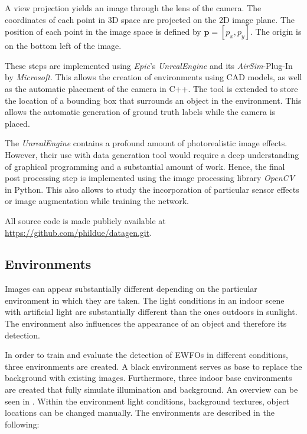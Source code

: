 A view projection yields an image through the lens of the camera. The coordinates of each point in 3D space are projected on the 2D image plane. The position of each point in the image space is defined by $\textbf{p} = [p_x,p_y]$. The origin is on the bottom left of the image.

These steps are implemented using \textit{Epic}'s \textit{UnrealEngine}\cite{unreal} and its \textit{AirSim}-Plug-In\cite{airsim} by \textit{Microsoft}. This allows the creation of environments using \ac{CAD} models, as well as the automatic placement of the camera in C++. The tool is extended to store the location of a bounding box that surrounds an object in the environment. This allows the automatic generation of ground truth labels while the camera is placed.

The \textit{UnrealEngine} contains a profound amount of photorealistic image effects. However, their use with data generation tool would require a deep understanding of graphical programming and a substantial amount of work. Hence, the final post processing step is implemented using the image processing library \textit{OpenCV} in Python. This also allows to study the incorporation of particular sensor effects or image augmentation while training the network.

All source code is made publicly available at \url{https://github.com/phildue/datagen.git}.

\subsection{Environments}

Images can appear substantially different depending on the particular environment in which they are taken. The light conditions in an indoor scene with artificial light are substantially different than the ones outdoors in sunlight. The environment also influences the appearance of an object and therefore its detection.

In order to train and evaluate the detection of \acp{EWFO} in different conditions, three environments are created. A black environment serves as base to replace the background with existing images. Furthermore, three indoor base environments are created that fully simulate illumination and background. An overview can be seen in . Within the environment light conditions, background textures, object locations can be changed manually. The environments are described in the following:


